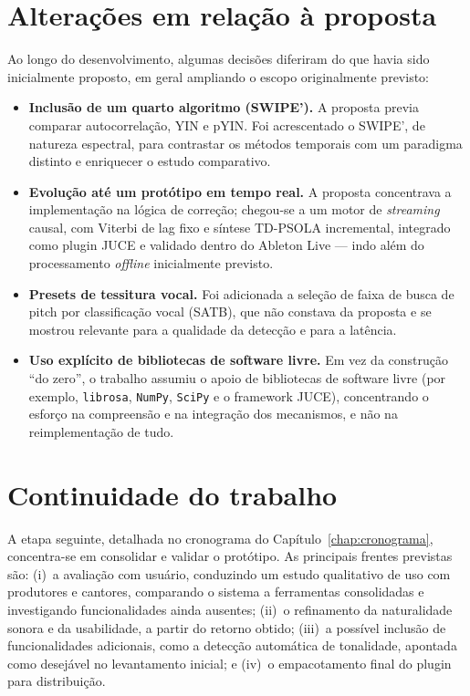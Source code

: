 \section{Alterações em relação à proposta}

Ao longo do desenvolvimento, algumas decisões diferiram do que havia sido
inicialmente proposto, em geral ampliando o escopo originalmente previsto:

\begin{itemize}
    \item \textbf{Inclusão de um quarto algoritmo (SWIPE').} A proposta previa
    comparar autocorrelação, YIN e pYIN. Foi acrescentado o SWIPE', de natureza
    espectral, para contrastar os métodos temporais com um paradigma distinto e
    enriquecer o estudo comparativo.
    \item \textbf{Evolução até um protótipo em tempo real.} A proposta concentrava
    a implementação na lógica de correção; chegou-se a um motor de
    \textit{streaming} causal, com Viterbi de lag fixo e síntese TD-PSOLA
    incremental, integrado como plugin JUCE e validado dentro do Ableton Live ---
    indo além do processamento \textit{offline} inicialmente previsto.
    \item \textbf{Presets de tessitura vocal.} Foi adicionada a seleção de faixa de
    busca de pitch por classificação vocal (SATB), que não constava da proposta e
    se mostrou relevante para a qualidade da detecção e para a latência.
    \item \textbf{Uso explícito de bibliotecas de software livre.} Em vez da
    construção ``do zero'', o trabalho assumiu o apoio de bibliotecas de software
    livre (por exemplo, \texttt{librosa}, \texttt{NumPy}, \texttt{SciPy} e o
    framework JUCE), concentrando o esforço na compreensão e na integração dos
    mecanismos, e não na reimplementação de tudo.
\end{itemize}

\section{Continuidade do trabalho}

A etapa seguinte, detalhada no cronograma do Capítulo~\ref{chap:cronograma},
concentra-se em consolidar e validar o protótipo. As principais frentes previstas
são: (i)~a avaliação com usuário, conduzindo um estudo qualitativo de uso com
produtores e cantores, comparando o sistema a ferramentas consolidadas e
investigando funcionalidades ainda ausentes; (ii)~o refinamento da naturalidade
sonora e da usabilidade, a partir do retorno obtido; (iii)~a possível inclusão de
funcionalidades adicionais, como a detecção automática de tonalidade, apontada
como desejável no levantamento inicial; e (iv)~o empacotamento final do plugin
para distribuição.


